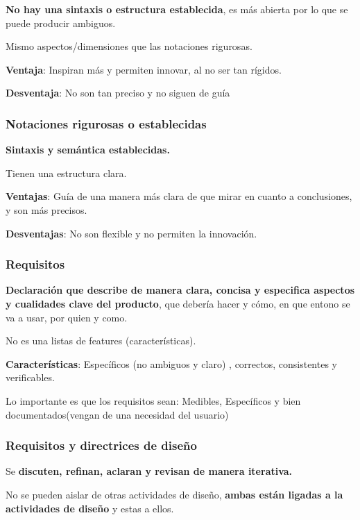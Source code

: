 \textbf{No hay una sintaxis o estructura establecida}, es más abierta
por lo que se puede producir ambiguos.

Mismo aspectos/dimensiones que las notaciones rigurosas.

\textbf{Ventaja}: Inspiran más y permiten innovar, al no ser tan
rígidos.

\textbf{Desventaja}: No son tan preciso y no siguen de guía

\hypertarget{notaciones-rigurosas-o-establecidas}{%
\subsubsection{Notaciones rigurosas o
establecidas}\label{notaciones-rigurosas-o-establecidas}}

\textbf{Sintaxis y semántica establecidas.}

Tienen una estructura clara.

\textbf{Ventajas}: Guía de una manera más clara de que mirar en cuanto a
conclusiones, y son más precisos.

\textbf{Desventajas}: No son flexible y no permiten la innovación.

\hypertarget{requisitos}{%
\subsubsection{Requisitos}\label{requisitos}}

\textbf{Declaración que describe de manera clara, concisa y especifica
aspectos y cualidades clave del producto}, que debería hacer y cómo, en
que entono se va a usar, por quien y como.

No es una listas de features (características).

\textbf{Características}: Específicos (no ambiguos y claro) , correctos,
consistentes y verificables.

Lo importante es que los requisitos sean: Medibles, Específicos y bien
documentados(vengan de una necesidad del usuario)

\hypertarget{requisitos-y-directrices-de-diseuxf1o}{%
\subsubsection{Requisitos y directrices de
diseño}\label{requisitos-y-directrices-de-diseuxf1o}}

Se \textbf{discuten, refinan, aclaran y revisan de manera iterativa.}

No se pueden aislar de otras actividades de diseño, \textbf{ambas están
ligadas a la actividades de diseño} y estas a ellos.

